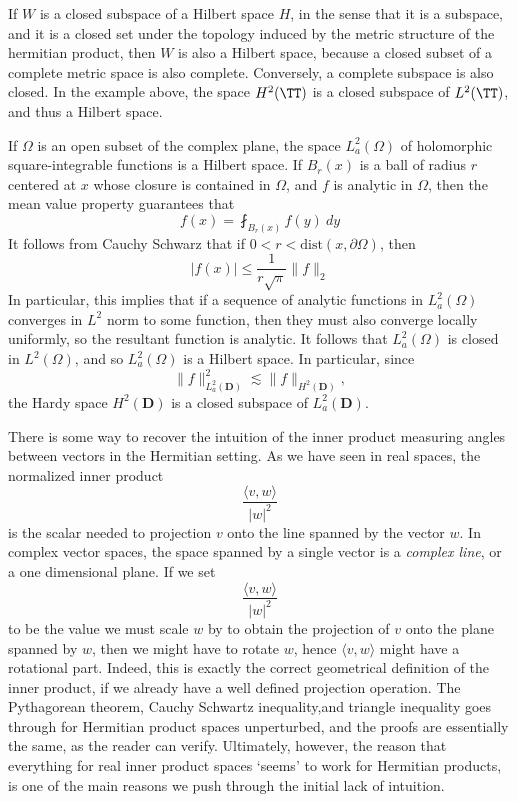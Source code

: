 If $W$ is a closed subspace of a Hilbert space $H$, in the sense that it is a subspace, and it is a closed set under the topology induced by the metric structure of the hermitian product, then $W$ is also a Hilbert space, because a closed subset of a complete metric space is also complete. Conversely, a complete subspace is also closed. In the example above, the space $H^2(\TT)$ is a closed subspace of $L^2(\TT)$, and thus a Hilbert space.

\begin{example}
    If $\Omega$ is an open subset of the complex plane, the space $L^2_a(\Omega)$ of holomorphic square-integrable functions is a Hilbert space. If $B_r(x)$ is a ball of radius $r$ centered at $x$ whose closure is contained in $\Omega$, and $f$ is analytic in $\Omega$, then the mean value property guarantees that
    \[ f(x) = \fint_{B_r(x)} f(y)\ dy \]
    It follows from Cauchy Schwarz that if $0 < r < \text{dist}(x,\partial \Omega)$, then
    \[ |f(x)| \leq \frac{1}{r\sqrt{\pi}} \|f \|_2 \]
    In particular, this implies that if a sequence of analytic functions in $L^2_a(\Omega)$ converges in $L^2$ norm to some function, then they must also converge locally uniformly, so the resultant function is analytic. It follows that $L^2_a(\Omega)$ is closed in $L^2(\Omega)$, and so $L^2_a(\Omega)$ is a Hilbert space. In particular, since
    \[ \| f \|_{L^2_a(\mathbf{D})}^2 \lesssim \| f \|_{H^2(\mathbf{D})}, \]
    the Hardy space $H^2(\mathbf{D})$ is a closed subspace of $L^2_a(\mathbf{D})$.
\end{example}

There is some way to recover the intuition of the inner product measuring angles between vectors in the Hermitian setting. As we have seen in real spaces, the normalized inner product
%
\[ \frac{\langle v, w \rangle}{|w|^2} \]
%
is the scalar needed to projection $v$ onto the line spanned by the vector $w$. In complex vector spaces, the space spanned by a single vector is a {\it complex line}, or a one dimensional plane. If we set
%
\[ \frac{\langle v, w \rangle}{|w|^2} \]
%
to be the value we must scale $w$ by to obtain the projection of $v$ onto the plane spanned by $w$, then we might have to rotate $w$, hence $\langle v, w \rangle$ might have a rotational part. Indeed, this is exactly the correct geometrical definition of the inner product, if we already have a well defined projection operation. The Pythagorean theorem, Cauchy Schwartz inequality,and triangle inequality goes through for Hermitian product spaces unperturbed, and the proofs are essentially the same, as the reader can verify. Ultimately, however, the reason that everything for real inner product spaces `seems' to work for Hermitian products, is one of the main reasons we push through the initial lack of intuition.

